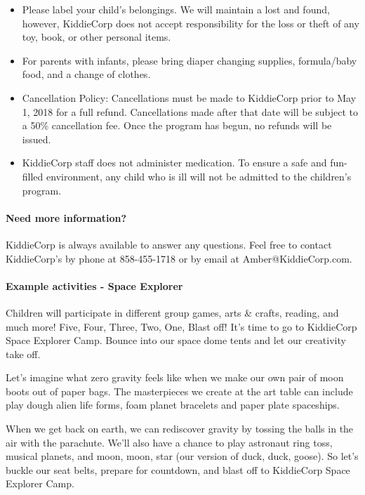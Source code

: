 \begin{itemize}
\item Please label your child's belongings. We will maintain a lost and found,
however, KiddieCorp does not accept responsibility for the loss or theft of
any toy, book, or other personal items.
\item For parents with infants, please bring diaper changing supplies,
formula/baby food, and a change of clothes.
\item Cancellation Policy: Cancellations must be made to KiddieCorp prior to
May 1, 2018 for a full refund. Cancellations made after that date will be
subject to a 50\% cancellation fee. Once the program has begun, no refunds
will be issued.
\item KiddieCorp staff does not administer medication. To ensure a safe and
fun-filled environment, any child who is ill will not be admitted to the
children's program.
\end{itemize}


\paragraph{Need more information?} KiddieCorp is always available to answer any questions. Feel free to
contact KiddieCorp's by phone at 858-455-1718 or by email at
Amber@KiddieCorp.com. 


\paragraph{Example activities - Space Explorer}

Children will participate in different group games, arts \& crafts, reading,
and much more! 
Five, Four, Three, Two, One, Blast off!  It’s time to go to KiddieCorp
Space Explorer Camp.  
Bounce into our space dome tents and let our creativity take off.



Let’s imagine what zero gravity feels like when we make our own
pair of moon boots out of paper bags.  The masterpieces we create 
at the art table can include play dough alien life forms, foam planet 
bracelets and paper plate spaceships.

When we get back on earth, we can rediscover gravity by tossing
the balls in the air with the parachute. We’ll also have a chance to 
play astronaut ring toss, musical planets, and moon, moon, star 
(our version of duck, duck, goose).  So let’s buckle our seat belts, 
prepare for countdown, and blast off to KiddieCorp Space Explorer Camp.
